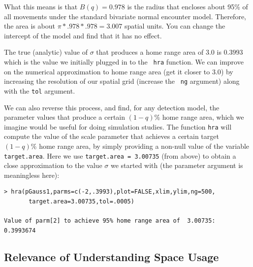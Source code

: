 What this means is that $B(q) = 0.978$ is the radius that
encloses about 95\% of all movements under the standard bivariate
normal encounter model.  Therefore, the area is about $\pi*.978*.978 =
3.007$ spatial units.  You can change the intercept of the model and
find that it has no effect.

The 
true (analytic)
 value of $\sigma$ that produces a home range area of 3.0 is
$0.3993$ which is the value we initially plugged in to the \mbox{\tt
  hra} function. We can improve on the numerical approximation to home range
area (get it closer to $3.0$) by increasing
the resolution of our spatial grid (increase the \mbox{\tt
  ng} argument) along with the \mbox{\tt tol} argument.

We can also reverse this process, and find, for any detection model,
the parameter values that produce a certain $(1-q)$\% home range
area, which we imagine would be useful for doing simulation studies.
The function \mbox{\tt hra} will compute the value of the scale parameter
that achieves a certain target $(1-q)\%$ home range area, by
simply providing a non-null value of the variable \mbox{\tt
  target.area}. Here we use \mbox{\tt target.area = 3.00735} (from
above) to obtain a close approximation to the value $\sigma$ we
started with (the parameter argument is meaningless here):
{\small
\begin{verbatim}
> hra(pGauss1,parms=c(-2,.3993),plot=FALSE,xlim,ylim,ng=500,
       target.area=3.00735,tol=.0005)

Value of parm[2] to achieve 95% home range area of  3.00735:  0.3993674
\end{verbatim}
}

\subsection{Relevance of Understanding Space Usage}

